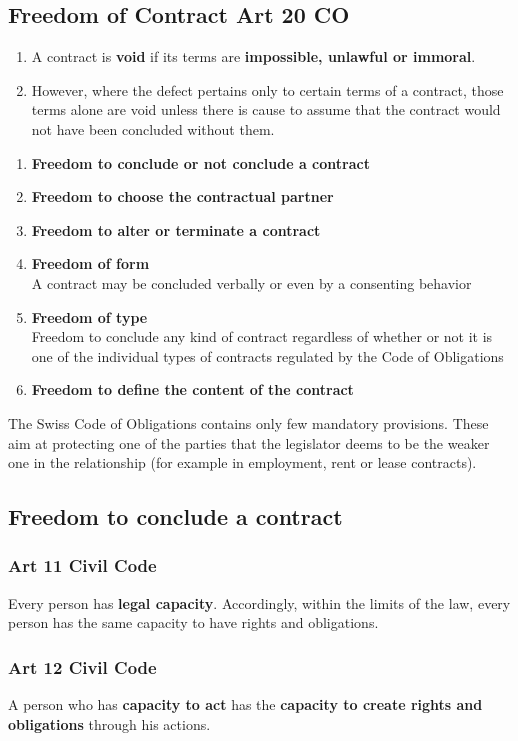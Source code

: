 \documentclass[11pt]{article}
\theoremstyle{definition}
\begin{document}
\subsection{Freedom of Contract Art 20 CO}
\begin{enumerate}[label=\arabic* ]
	\item A contract is \textbf{void} if its terms are \textbf{impossible, unlawful or immoral}.
	\item However, where the defect pertains only to certain terms of a contract, those terms alone are void unless there is cause to assume that the contract would not have been concluded without them.
\end{enumerate}

\begin{enumerate}
	\item \textbf{Freedom to conclude or not conclude a contract}
	\item \textbf{Freedom to choose the contractual partner}
	\item \textbf{Freedom to alter or terminate a contract}
	\item \textbf{Freedom of form}\\
	A contract may be concluded verbally or even by a consenting behavior
	\item \textbf{Freedom of type}\\
	Freedom to conclude any kind of contract regardless of whether or not it is
	one of the individual types of contracts regulated by the Code of Obligations
	\item \textbf{Freedom to define the content of the contract}
\end{enumerate}
The Swiss Code of Obligations contains only few mandatory provisions. These aim at protecting one of the parties that the legislator deems to be the weaker one in the relationship (for example in employment, rent or lease contracts).

\subsection{Freedom to conclude a contract}
\subsubsection{Art 11 Civil Code}
Every person has \textbf{legal capacity}. Accordingly, within the limits of the law, every person has the same capacity to have rights and obligations.

\subsubsection{Art 12 Civil Code}
A person who has \textbf{capacity to act} has the \textbf{capacity to create rights and obligations} through his actions.
\end{document}
